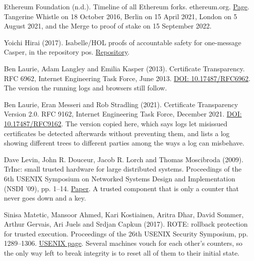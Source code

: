 \documentclass[11pt,twoside]{article}
\theoremstyle{thielethm}
\theoremstyle{thieledef}
\theoremstyle{thieledef}
\theoremstyle{thieledef}
\theoremstyle{thielethm}
\theoremstyle{thieleobs}
\theoremstyle{thielethm}
\begin{document}
\noindent Ethereum Foundation (n.d.). Timeline of all Ethereum forks. ethereum.org. \href{https://ethereum.org/en/ethereum-forks/}{Page}. Tangerine Whistle on 18 October 2016, Berlin on 15 April 2021, London on 5 August 2021, and the Merge to proof of stake on 15 September 2022.
\par\medskip

\noindent Yoichi Hirai (2017). Isabelle/HOL proofs of accountable safety for one-message Casper, in the repository pos. \href{https://github.com/palmskog/pos}{Repository}.
\par\medskip

\noindent Ben Laurie, Adam Langley and Emilia Kasper (2013). Certificate Transparency. RFC 6962, Internet Engineering Task Force, June 2013. \href{https://doi.org/10.17487/RFC6962}{DOI: 10.17487/RFC6962}. The version the running logs and browsers still follow.
\par\medskip

\noindent Ben Laurie, Eran Messeri and Rob Stradling (2021). Certificate Transparency Version 2.0. RFC 9162, Internet Engineering Task Force, December 2021. \href{https://doi.org/10.17487/RFC9162}{DOI: 10.17487/RFC9162}. The version copied here, which says logs let misissued certificates be detected afterwards without preventing them, and lists a log showing different trees to different parties among the ways a log can misbehave.
\par\medskip

\noindent Dave Levin, John R. Douceur, Jacob R. Lorch and Thomas Moscibroda (2009). TrInc: small trusted hardware for large distributed systems. Proceedings of the 6th USENIX Symposium on Networked Systems Design and Implementation (NSDI '09), pp. 1--14. \href{https://www.usenix.org/legacy/event/nsdi09/tech/full_papers/levin/levin.pdf}{Paper}. A trusted component that is only a counter that never goes down and a key.
\par\medskip

\noindent Sinisa Matetic, Mansoor Ahmed, Kari Kostiainen, Aritra Dhar, David Sommer, Arthur Gervais, Ari Juels and Srdjan Capkun (2017). ROTE: rollback protection for trusted execution. Proceedings of the 26th USENIX Security Symposium, pp. 1289--1306. \href{https://www.usenix.org/conference/usenixsecurity17/technical-sessions/presentation/matetic}{USENIX page}. Several machines vouch for each other's counters, so the only way left to break integrity is to reset all of them to their initial state.
\par\medskip
\end{document}
